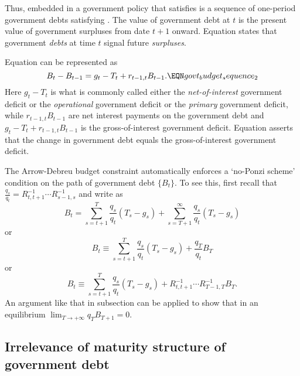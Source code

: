 Thus, embedded in a government  policy that satisfies  is a sequence of one-period
government debts satisfying . The value of government debt at $t$ is the present value
of government surpluses from date $t+1$ onward. Equation  states that government {\it debts\/}
at time $t$ signal future {\it surpluses\/}.

Equation  can be represented as
$$
B_t - B_{t-1} = g_t - T_t + r_{t-1,t} B_{t-1}. \EQN govt_budget_sequence_2
$$
Here $g_t - T_t$ is what is commonly called  either the {\it net-of-interest\/} government deficit
or the {\it operational\/} government deficit or the {\it primary\/} government deficit, while $r_{t-1,t} B_{t-1}$ are net interest payments on the government
debt and  $ g_t - T_t + r_{t-1,t} B_{t-1}$ is the gross-of-interest government deficit.
Equation  asserts that the change in government debt equals the
gross-of-interest government deficit.
%
%
%
%

The Arrow-Debreu budget constraint  automatically enforces a `no-Ponzi scheme' condition on the path of
government debt $\{B_t\}$.
To see this, first recall that ${\frac{q_s}{q_t}} =  R_{t,t+1}^{-1} \cdots R_{s-1,s}^{-1}$ and
write  
as
$$ B_t = \sum_{s=t+1}^T {\frac{q_s}{q_t}} (T_s - g_s )+ \sum_{s=T+1}^\infty {\frac{q_s}{q_t} } (T_s - g_s ) $$
or
$$ B_t \equiv \sum_{s=t+1}^T {\frac{q_s}{q_t}} (T_s - g_s )+ {\frac{q_{T}}{q_t}}B_{T} $$
or
$$ B_t \equiv \sum_{s=t+1}^T {\frac{q_s}{q_t} } (T_s - g_s )+ R_{t,t+1}^{-1} \cdots R_{T-1,T}^{-1} B_{T}. $$
An argument like that in subsection  can be applied to show that in an equilibrium $\lim_{T \rightarrow +\infty} q_T B_{T+1} = 0$.
\subsection{Irrelevance of maturity structure of government debt}

